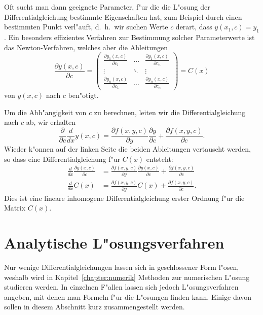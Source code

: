 Oft sucht man dann geeignete Parameter, f"ur die die L"osung der
Differentialgleichung bestimmte Eigenschaften hat, zum Beispiel durch
einen bestimmten Punkt verl"auft, d.~h.~wir suchen Werte $c$ derart,
dass $y(x_1,c)=y_1$.
Ein besonders effizientes Verfahren zur Bestimmung solcher Parameterwerte
ist das Newton-Verfahren, welches aber die Ableitungen
%
\[
\frac{\partial y(x,c)}{\partial c}
=
\begin{pmatrix}
\displaystyle \frac{\partial y_1(x,c)}{\partial c_1}
	&\dots
		&\displaystyle \frac{\partial y_1(x,c)}{\partial c_n}\\
\vdots
	&\ddots
		&\vdots\\
\displaystyle \frac{\partial y_n(x,c)}{\partial c_1}
	&\dots
		&\displaystyle \frac{\partial y_n(x,c)}{\partial c_n}
\end{pmatrix}
=C(x)
\]
von $y(x,c)$ nach $c$ ben"otigt.

Um die Abh"angigkeit von $c$ zu berechnen, leiten wir die
Differentialgleichung nach $c$ ab, wir erhalten 
\[
\frac{\partial}{\partial c} \frac{d}{dx} y(x,c)
=
\frac{\partial f(x,y,c)}{\partial y}\frac{\partial y}{\partial c}
+
\frac{\partial f(x,y,c)}{\partial c}.
\]
Wieder k"onnen auf der linken Seite die beiden Ableitungen vertauscht
werden, so dass eine Differentialgleichung f"ur $C(x)$ entsteht:
\begin{align*}
\frac{d}{dx}\frac{\partial y(x,c)}{\partial c}
&=
\frac{\partial f(x,y,c)}{\partial y}\frac{\partial y(x,c)}{\partial c}
+
\frac{\partial f(x,y,c)}{\partial c}
\\
\frac{d}{dx}C(x)
&=
\frac{\partial f(x,y,c)}{\partial y}C(x)
+
\frac{\partial f(x,y,c)}{\partial c}.
\end{align*}
Dies ist eine lineare inhomogene Differentialgleichung erster Ordnung
f"ur die Matrix $C(x)$.

\section{Analytische L"osungsverfahren\label{section:analytischeverfahren}}
Nur wenige Differentialgleichungen lassen sich in geschlossener Form
%
l"osen, weshalb wird in Kapitel~\ref{chapter:numerik} Methoden zur
numerischen L"osung studieren werden.
In einzelnen F"allen lassen sich jedoch L"osungsverfahren angeben,
mit denen man Formeln f"ur die L"osungen finden kann.
Einige davon sollen in diesem Abschnitt kurz zusammengestellt werden.

